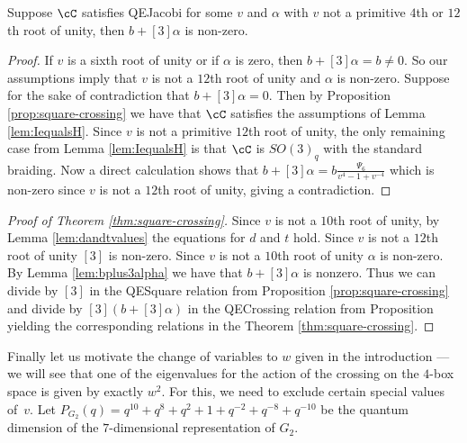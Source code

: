 \documentclass[12pt]{amsart}
\begin{document}
\begin{lemma} \label{lem:bplus3alpha}
Suppose $\cC$ satisfies QEJacobi for some $v$ and $\alpha$ with $v$ not a
primitive $4$th or $12$th root of unity, then $b+[3]\alpha$ is
non-zero.
\end{lemma}
\begin{proof}
If $v$ is a sixth root of unity or if $\alpha$ is zero, then $b+[3]\alpha = b \neq 0$.  So our
assumptions imply that $v$ is not a $12$th root of unity and $\alpha$ is non-zero.
Suppose for the sake of contradiction that $b+[3]\alpha = 0$.  Then by Proposition
\ref{prop:square-crossing} we have that $\cC$ satisfies the assumptions of
Lemma \ref{lem:IequalsH}.  Since $v$ is not a primitive $12$th root of unity, the only
remaining case from Lemma \ref{lem:IequalsH} is that $\cC$ is $SO(3)_q$ with
the standard braiding.  Now a direct calculation shows that $b+[3] \alpha = b
\frac{\Psi_6}{v^4-1+v^{-4}}$ which is non-zero since $v$ is not a
$12$th root of unity, giving a contradiction.
\end{proof}


\begin{proof}[Proof of Theorem \ref{thm:square-crossing}]
Since $v$ is not a $10$th root of unity, by Lemma \ref{lem:dandtvalues} the
equations for $d$ and $t$ hold.  Since $v$ is not a $12$th root of unity $[3]$
is non-zero.  Since $v$ is not a $10$th root of unity $\alpha$ is non-zero.
By Lemma \ref{lem:bplus3alpha} we have that $b+[3]\alpha$ is
nonzero.  Thus we can divide by $[3]$ in the QESquare relation from
Proposition \ref{prop:square-crossing} and divide by $[3](b+[3]\alpha)$ in the
QECrossing relation from Proposition yielding the corresponding relations in
the Theorem \ref{thm:square-crossing}.
\end{proof}


Finally let us motivate the change of variables to $w$ given in the
introduction --- we will see that one of the eigenvalues for the action of
the crossing on the $4$-box space is given by exactly $w^2$.
For this, we need to exclude certain special values of~$v$.
Let $P_{G_2}(q) = q^{10}+q^{8}+q^{2}+1+q^{-2}+q^{-8}+q^{-10}$ be the quantum
dimension of the $7$-dimensional representation of $G_2$.
\end{document}

